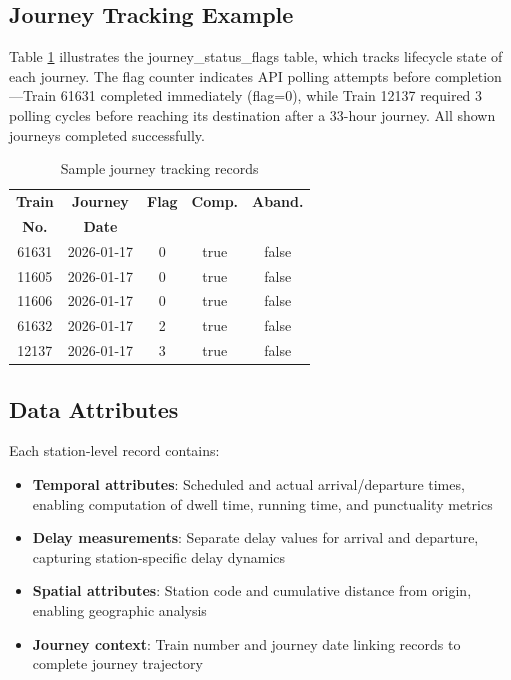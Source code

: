\documentclass[conference]{IEEEtran}
\begin{document}
\subsection{Journey Tracking Example}

Table \ref{tab:journey_flags} illustrates the journey\_status\_flags table, which tracks lifecycle state of each journey. The flag counter indicates API polling attempts before completion—Train 61631 completed immediately (flag=0), while Train 12137 required 3 polling cycles before reaching its destination after a 33-hour journey. All shown journeys completed successfully.

\begin{table}[h]
\centering
\caption{Sample journey tracking records}
\label{tab:journey_flags}
\small
\begin{tabular}{@{}ccccc@{}}
\toprule
\textbf{Train} & \textbf{Journey} & \textbf{Flag} & \textbf{Comp.} & \textbf{Aband.} \\
\textbf{No.} & \textbf{Date} & & & \\
\midrule
61631 & 2026-01-17 & 0 & true & false \\
11605 & 2026-01-17 & 0 & true & false \\
11606 & 2026-01-17 & 0 & true & false \\
61632 & 2026-01-17 & 2 & true & false \\
12137 & 2026-01-17 & 3 & true & false \\
\bottomrule
\end{tabular}
\end{table}

\subsection{Data Attributes}

Each station-level record contains:

\begin{itemize}
    \item \textbf{Temporal attributes}: Scheduled and actual arrival/departure times, enabling computation of dwell time, running time, and punctuality metrics
    \item \textbf{Delay measurements}: Separate delay values for arrival and departure, capturing station-specific delay dynamics
    \item \textbf{Spatial attributes}: Station code and cumulative distance from origin, enabling geographic analysis
    \item \textbf{Journey context}: Train number and journey date linking records to complete journey trajectory
\end{itemize}
\end{document}
